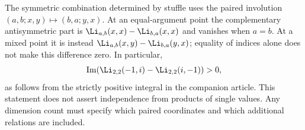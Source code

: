 The symmetric combination determined by stuffle uses the paired
involution $(a,b;x,y)\mapsto(b,a;y,x)$. At an equal-argument point the
complementary antisymmetric part is
$\Li_{a,b}(x,x)-\Li_{b,a}(x,x)$ and vanishes when $a=b$.
At a mixed point it is instead
$\Li_{a,b}(x,y)-\Li_{b,a}(y,x)$; equality of indices alone does not
make this difference zero. In particular,
\[
\operatorname{Im}\!\left(\Li_{2,2}(-1,i)-\Li_{2,2}(i,-1)\right)>0,
\]
as follows from the strictly positive integral in the companion
article. This statement does not assert independence from products of
single values. Any dimension count must specify which paired
coordinates and which additional relations are included.

